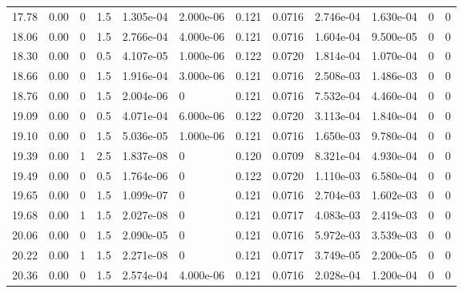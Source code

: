 \documentclass[preview]{standalone}
\begin{document}
{{{\begin{tabular}{L{1.2cm}C{1.2cm} C{0.3cm}C{0.5cm} C{1.4cm}C{1.4cm} C{1.4cm}C{1.4cm} C{1.6cm}C{1.6cm} C{1.6cm}C{1.6cm}}
  17.78  &  0.00  & 0     & 1.5 &  1.305e-04  & 2.000e-06  &  0.121&   0.0716& 2.746e-04 & 1.630e-04   &  0 & 0  \\ 
  18.06  &  0.00  & 0     & 1.5 &  2.766e-04  & 4.000e-06  &  0.121&   0.0716& 1.604e-04 & 9.500e-05   &  0 & 0  \\ 
  18.30  &  0.00  & 0     & 0.5 &  4.107e-05  & 1.000e-06  &  0.122&   0.0720& 1.814e-04 & 1.070e-04   &  0 & 0  \\ 
  18.66  &  0.00  & 0     & 1.5 &  1.916e-04  & 3.000e-06  &  0.121&   0.0716& 2.508e-03 & 1.486e-03   &  0 & 0  \\ 
  18.76  &  0.00  & 0     & 1.5 &  2.004e-06  & 0  &  0.121&   0.0716& 7.532e-04 & 4.460e-04   &  0 & 0  \\ 
  19.09  &  0.00  & 0     & 0.5 &  4.071e-04  & 6.000e-06  &  0.122&   0.0720& 3.113e-04 & 1.840e-04   &  0 & 0  \\ 
  19.10  &  0.00  & 0     & 1.5 &  5.036e-05  & 1.000e-06  &  0.121&   0.0716& 1.650e-03 & 9.780e-04   &  0 & 0  \\ 
  19.39  &  0.00  & 1     & 2.5 &  1.837e-08  & 0  &  0.120&   0.0709& 8.321e-04 & 4.930e-04   &  0 & 0  \\ 
  19.49  &  0.00  & 0     & 0.5 &  1.764e-06  & 0  &  0.122&   0.0720& 1.110e-03 & 6.580e-04   &  0 & 0  \\ 
  19.65  &  0.00  & 0     & 1.5 &  1.099e-07  & 0  &  0.121&   0.0716& 2.704e-03 & 1.602e-03   &  0 & 0  \\ 
  19.68  &  0.00  & 1     & 1.5 &  2.027e-08  & 0  &  0.121&   0.0717& 4.083e-03 & 2.419e-03   &  0 & 0  \\ 
  20.06  &  0.00  & 0     & 1.5 &  2.090e-05  & 0  &  0.121&   0.0716& 5.972e-03 & 3.539e-03   &  0 & 0  \\ 
  20.22  &  0.00  & 1     & 1.5 &  2.271e-08  & 0  &  0.121&   0.0717& 3.749e-05 & 2.200e-05   &  0 & 0  \\ 
  20.36  &  0.00  & 0     & 1.5 &  2.574e-04  & 4.000e-06  &  0.121&   0.0716& 2.028e-04 & 1.200e-04   &  0 & 0  \\ 
\hline 
\end{tabular} 

}}}
\end{document}
